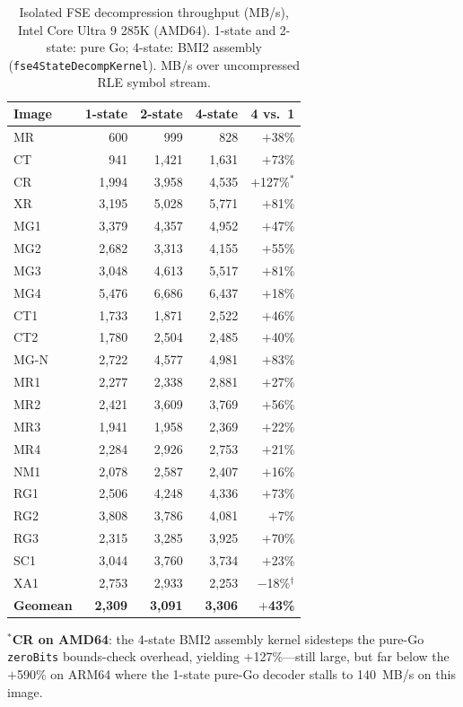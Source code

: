 \documentclass[journal]{IEEEtran}
\begin{document}
\begin{table}[tbp]
\centering
\caption{Isolated FSE decompression throughput (MB/s), Intel Core Ultra 9
285K (AMD64). 1-state and 2-state: pure Go; 4-state: BMI2 assembly
(\texttt{fse4StateDecompKernel}). MB/s over uncompressed RLE symbol stream.}
\label{tab:fse-amd64}
\scriptsize
\begin{tabular}{lrrrr}
\toprule
Image & 1-state & 2-state & 4-state & 4 vs.\ 1 \\
\midrule
MR   &   600 &   999 &   828 & $+$38\% \\
CT   &   941 & 1,421 & 1,631 & $+$73\% \\
CR   & 1,994 & 3,958 & 4,535 & $+$127\%$^*$ \\
XR   & 3,195 & 5,028 & 5,771 & $+$81\% \\
MG1  & 3,379 & 4,357 & 4,952 & $+$47\% \\
MG2  & 2,682 & 3,313 & 4,155 & $+$55\% \\
MG3  & 3,048 & 4,613 & 5,517 & $+$81\% \\
MG4  & 5,476 & 6,686 & 6,437 & $+$18\% \\
CT1  & 1,733 & 1,871 & 2,522 & $+$46\% \\
CT2  & 1,780 & 2,504 & 2,485 & $+$40\% \\
MG-N & 2,722 & 4,577 & 4,981 & $+$83\% \\
MR1  & 2,277 & 2,338 & 2,881 & $+$27\% \\
MR2  & 2,421 & 3,609 & 3,769 & $+$56\% \\
MR3  & 1,941 & 1,958 & 2,369 & $+$22\% \\
MR4  & 2,284 & 2,926 & 2,753 & $+$21\% \\
NM1  & 2,078 & 2,587 & 2,407 & $+$16\% \\
RG1  & 2,506 & 4,248 & 4,336 & $+$73\% \\
RG2  & 3,808 & 3,786 & 4,081 & $+$7\% \\
RG3  & 2,315 & 3,285 & 3,925 & $+$70\% \\
SC1  & 3,044 & 3,760 & 3,734 & $+$23\% \\
XA1  & 2,753 & 2,933 & 2,253 & $-$18\%$^\dagger$ \\
\midrule
\textbf{Geomean} & \textbf{2,309} & \textbf{3,091} & \textbf{3,306} & \textbf{$+$43\%} \\
\bottomrule
\end{tabular}
\end{table}

$^*$\textbf{CR on AMD64}: the 4-state BMI2 assembly kernel sidesteps the
pure-Go \texttt{zeroBits} bounds-check overhead, yielding $+$127\%---still
large, but far below the $+$590\% on ARM64 where the 1-state pure-Go
decoder stalls to 140~MB/s on this image.
\end{document}
